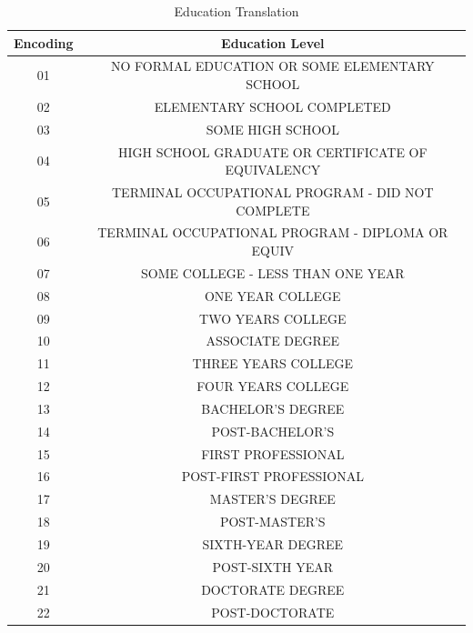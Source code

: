 \documentclass{article}
\begin{document}
\begin{center}
    \begin{table}
        \centering
        \begin{tabular}{ |c|c| }
            \hline
            Encoding & Education Level \\
            \hline
            01 & NO FORMAL EDUCATION OR SOME ELEMENTARY SCHOOL \\
            02 & ELEMENTARY SCHOOL COMPLETED \\
            03 & SOME HIGH SCHOOL \\
            04 & HIGH SCHOOL GRADUATE OR CERTIFICATE OF EQUIVALENCY \\
            05 & TERMINAL OCCUPATIONAL PROGRAM - DID NOT COMPLETE \\
            06 & TERMINAL OCCUPATIONAL PROGRAM - DIPLOMA OR EQUIV \\
            07 & SOME COLLEGE - LESS THAN ONE YEAR \\
            08 & ONE YEAR COLLEGE \\
            09 & TWO YEARS COLLEGE \\
            10 & ASSOCIATE DEGREE \\
            11 & THREE YEARS COLLEGE \\
            12 & FOUR YEARS COLLEGE \\
            13 & BACHELOR'S DEGREE \\
            14 & POST-BACHELOR'S \\
            15 & FIRST PROFESSIONAL \\
            16 & POST-FIRST PROFESSIONAL \\
            17 & MASTER'S DEGREE \\
            18 & POST-MASTER'S \\
            19 & SIXTH-YEAR DEGREE \\
            20 & POST-SIXTH YEAR \\
            21 & DOCTORATE DEGREE \\
            22 & POST-DOCTORATE \\
            \hline
        \end{tabular}
        \caption{Education Translation}
        \label{tab:13}
    \end{table}
\end{center}
\end{document}
